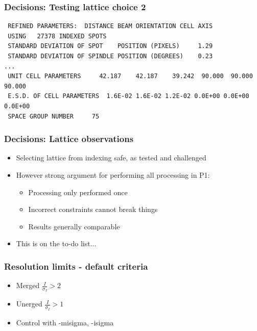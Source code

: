 \documentclass[slides,compress]{beamer}
\begin{document}
\begin{frame}[fragile]
\frametitle{Decisions: Testing lattice choice 2}
{\small
\begin{verbatim}
 REFINED PARAMETERS:  DISTANCE BEAM ORIENTATION CELL AXIS                   
 USING   27378 INDEXED SPOTS
 STANDARD DEVIATION OF SPOT    POSITION (PIXELS)     1.29
 STANDARD DEVIATION OF SPINDLE POSITION (DEGREES)    0.23
...
 UNIT CELL PARAMETERS     42.187    42.187    39.242  90.000  90.000  90.000
 E.S.D. OF CELL PARAMETERS  1.6E-02 1.6E-02 1.2E-02 0.0E+00 0.0E+00 0.0E+00
 SPACE GROUP NUMBER     75
\end{verbatim}
}
\end{frame}

\begin{frame}
\frametitle{Decisions: Lattice observations}
\begin{itemize}
\item{Selecting lattice from indexing safe, as tested and challenged}
\item{However strong argument for performing all processing in P1:
\begin{itemize}
\item{Processing only performed once}
\item{Incorrect constraints cannot break things}
\item{Results generally comparable}
\end{itemize}
}
\item{This is on the to-do list...}
\end{itemize}
\end{frame}

\begin{frame}
\frametitle{Resolution limits - default criteria}
\begin{itemize}
\item{Merged $\frac{I}{\sigma_I} > 2$}
\item{Unerged $\frac{I}{\sigma_I} > 1$}
\item{Control with -misigma, -isigma}
\end{itemize}
\end{frame}
\end{document}
